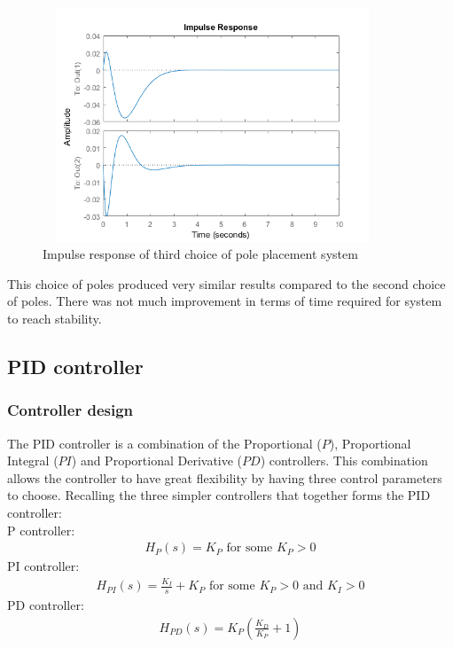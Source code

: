 \documentclass [12pt,letterpaper]{exam}
\begin{document}
\begin{figure}[H]
  \centering
    \includegraphics[width=10.15cm, height=7cm]{pl3_impulse} 
  \caption{Impulse response of third choice of pole placement system}
  \label{fig:pl3_impulse}
\end{figure}



This choice of poles produced very similar results compared to the second choice of poles. There was not much improvement in terms of time required for system to reach stability.


\subsection{PID controller}
\subsubsection{Controller design}
The PID controller is a combination of the Proportional ($P$), Proportional Integral ($PI$) and Proportional Derivative ($PD$) controllers. This combination allows the controller to have great flexibility by having three control parameters to choose. Recalling the three simpler controllers that together forms the PID controller: \\
P controller:
\begin{align}
H_P(s) = K_P \mbox{ for some } K_P > 0
\end{align}
PI controller:
\begin{align}
H_{PI}(s) = \frac{K_I}{s} + K_P \mbox{ for some } K_P > 0 \mbox{ and } K_I > 0
\end{align}
PD controller:
\begin{align}
H_{PD}(s) = K_P(\frac{K_D}{K_P} + 1)
\end{align}
\end{document}
